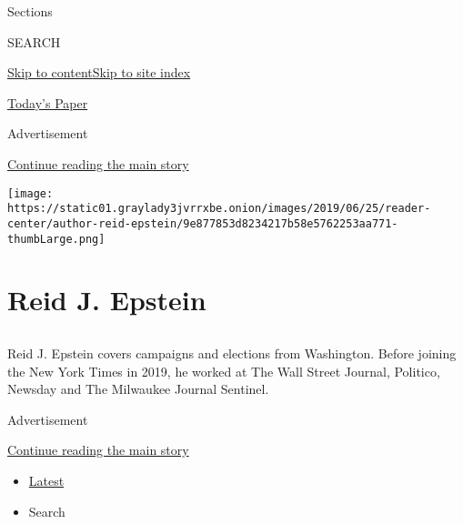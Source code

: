 Sections

SEARCH

\protect\hyperlink{site-content}{Skip to
content}\protect\hyperlink{site-index}{Skip to site index}

\href{https://myaccount.nytimes3xbfgragh.onion/auth/login?response_type=cookie\&client_id=vi}{}

\href{https://www.nytimes3xbfgragh.onion/section/todayspaper}{Today's
Paper}

Advertisement

\protect\hyperlink{after-top}{Continue reading the main story}

\texttt{[image: https://static01.graylady3jvrrxbe.onion/images/2019/06/25/reader-center/author-reid-epstein/9e877853d8234217b58e5762253aa771-thumbLarge.png]}

\hypertarget{reid-j-epstein}{%
\section{Reid J. Epstein}\label{reid-j-epstein}}

\hypertarget{section}{%
\subsection{}\label{section}}

Reid J. Epstein covers campaigns and elections from Washington. Before
joining the New York Times in 2019, he worked at The Wall Street
Journal, Politico, Newsday and The Milwaukee Journal Sentinel.

Advertisement

\protect\hyperlink{after-mid1}{Continue reading the main story}

\begin{itemize}
\tightlist
\item
  \protect\hyperlink{stream-panel}{Latest}
\item
  Search
\end{itemize}

